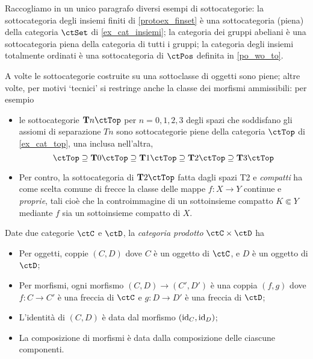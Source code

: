\begin{example}
	Raccogliamo in un unico paragrafo diversi esempi di sottocategorie: la sottocategoria degli insiemi finiti di \ref{protoex_finset} è una sottocategoria (piena) della categoria \(\ctSet\) di \ref{ex_cat_insiemi}; la categoria dei gruppi abeliani è una sottocategoria piena della categoria di tutti i gruppi; la categoria degli insiemi totalmente ordinati è una sottocategoria di \(\ctPos\) definita in \ref{po_wo_to}.

	A volte le sottocategorie costruite su una sottoclasse di oggetti sono piene; altre volte, per motivi `tecnici' si restringe anche la classe dei morfismi ammissibili: per esempio
	\begin{itemize}
		\item le sottocategorie \(\cate{T}n\ctTop\) per \(n=0,1,2,3\) degli spazi che soddisfano gli assiomi di separazione \(Tn\) sono sottocategorie piene della categoria \(\ctTop\) di \ref{ex_cat_top}, una inclusa nell'altra,
		      \[\ctTop\supseteq\cate{T}0\ctTop\supseteq\cate{T}1\ctTop\supseteq\cate{T}2\ctTop\supseteq\cate{T}3\ctTop\]
		\item Per contro, la sottocategoria di \(\cate{T}2\ctTop\) fatta dagli spazi T2 e \emph{compatti} ha come scelta comune di frecce la classe delle mappe \(f : X\to Y\) continue e \emph{proprie}, tali cioè che la controimmagine di un sottoinsieme compatto \(K\Subset Y\) mediante \(f\) sia un sottoinsieme compatto di \(X\).
	\end{itemize}
\end{example}
\begin{definition}\label{def_cat_prodotto}
	Date due categorie \(\ctC\) e \(\ctD\), la \emph{categoria prodotto} \(\ctC\times\ctD\) ha
	\begin{itemize}
		\item Per oggetti, coppie \((C,D)\) dove \(C\) è un oggetto di \(\ctC\), e \(D\) è un oggetto di \(\ctD\);
		\item Per morfismi, ogni morfismo \((C,D)\to(C',D')\) è una coppia \((f,g)\) dove \(f:C\to C'\) è una freccia di \(\ctC\) e \(g:D\to D'\) è una freccia di \(\ctD\);
		\item L'identità di \((C,D)\) è data dal morfismo \((\mathrm{id}_C,\mathrm{id}_D)\);
		\item La composizione di morfismi è data dalla composizione delle ciascune componenti.
	\end{itemize}
\end{definition}
